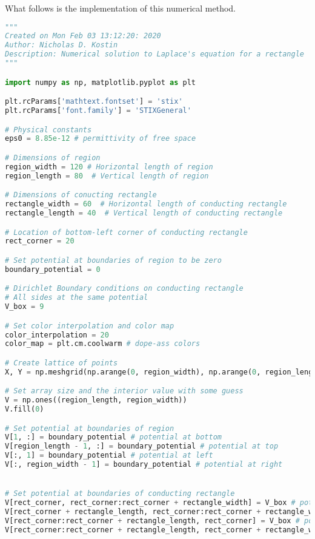 \documentclass{article}
\numberwithin{equation}{section}
\begin{document}
What follows is the implementation of this numerical method.

% 

\begin{lstlisting}[language=Python]
"""
Created on Mon Feb 03 13:12:20: 2020
Author: Nicholas D. Kostin
Description: Numerical solution to Laplace's equation for a rectangle
"""

import numpy as np, matplotlib.pyplot as plt

plt.rcParams['mathtext.fontset'] = 'stix'
plt.rcParams['font.family'] = 'STIXGeneral'

# Physical constants
eps0 = 8.85e-12 # permittivity of free space

# Dimensions of region
region_width = 120 # Horizontal length of region
region_length = 80  # Vertical length of region

# Dimensions of conucting rectangle
rectangle_width = 60  # Horizontal length of conducting rectangle
rectangle_length = 40  # Vertical length of conducting rectangle

# Location of bottom-left corner of conducting rectangle
rect_corner = 20

# Set potential at boundaries of region to be zero
boundary_potential = 0

# Dirichlet Boundary conditions on conducting rectangle
# All sides at the same potential
V_box = 9

# Set color interpolation and color map
color_interpolation = 20
color_map = plt.cm.coolwarm # dope-ass colors

# Create lattice of points
X, Y = np.meshgrid(np.arange(0, region_width), np.arange(0, region_length))

# Set array size and the interior value with some guess
V = np.ones((region_length, region_width))
V.fill(0)

# Set potential at boundaries of region
V[1, :] = boundary_potential # potential at bottom
V[region_length - 1, :] = boundary_potential # potential at top
V[:, 1] = boundary_potential # potential at left
V[:, region_width - 1] = boundary_potential # potential at right


# Set potential at boundaries of conducting rectangle
V[rect_corner, rect_corner:rect_corner + rectangle_width] = V_box # potential at bottom
V[rect_corner + rectangle_length, rect_corner:rect_corner + rectangle_width] = V_box # potential at top
V[rect_corner:rect_corner + rectangle_length, rect_corner] = V_box # potential at left
V[rect_corner:rect_corner + rectangle_length, rect_corner + rectangle_width] = V_box # potential at right


\end{lstlisting}
\end{document}
